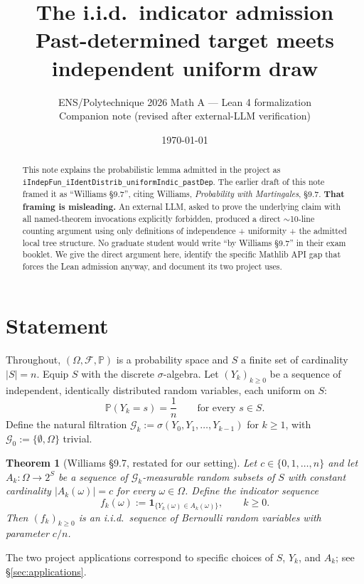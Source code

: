 \documentclass[11pt,a4paper]{article}
\title{The i.i.d.\ indicator admission \\
  \large Past-determined target meets independent uniform draw}
\author{ENS/Polytechnique 2026 Math A --- Lean 4 formalization\\
  Companion note (revised after external-LLM verification)}
\date{\today}
\newcommand{\Prob}{\mathbb{P}}
\newcommand{\F}{\mathcal{F}}
\newcommand{\G}{\mathcal{G}}
\newcommand{\one}{\mathbf{1}}
\theoremstyle{plain}
\newtheorem{thm}{Theorem}
\theoremstyle{definition}
\theoremstyle{remark}
\begin{document}
\maketitle

\begin{abstract}
This note explains the probabilistic lemma admitted in the project as
\verb|iIndepFun_iIdentDistrib_uniformIndic_pastDep|. The earlier
draft of this note framed it as ``Williams \S 9.7'', citing
Williams, \emph{Probability with Martingales}, \S 9.7. \textbf{That
framing is misleading.} An external LLM, asked to prove the
underlying claim with all named-theorem invocations explicitly
forbidden, produced a direct $\sim$10-line counting argument
using only definitions of independence + uniformity + the
admitted local tree structure. No graduate student would write
``by Williams \S 9.7'' in their exam booklet. We give the direct
argument here, identify the specific Mathlib API gap that forces
the Lean admission anyway, and document its two project uses.
\end{abstract}

\section{Statement}

Throughout, $(\Omega, \F, \Prob)$ is a probability space and $S$ a
finite set of cardinality $|S| = n$. Equip $S$ with the discrete
$\sigma$-algebra. Let $(Y_k)_{k \geq 0}$ be a sequence of independent,
identically distributed random variables, each uniform on $S$:
\[
  \Prob(Y_k = s) = \frac{1}{n} \qquad \text{for every } s \in S.
\]
Define the natural filtration $\G_k := \sigma(Y_0, Y_1, \dots, Y_{k-1})$
for $k \geq 1$, with $\G_0 := \{\emptyset, \Omega\}$ trivial.

\begin{thm}[Williams \S 9.7, restated for our setting]
\label{thm:main}
Let $c \in \{0, 1, \dots, n\}$ and let $A_k : \Omega \to 2^S$ be a
sequence of $\G_k$-measurable random subsets of $S$ with constant
cardinality $|A_k(\omega)| = c$ for every $\omega \in \Omega$.
Define the indicator sequence
\[
  f_k(\omega) := \one_{\{Y_k(\omega) \in A_k(\omega)\}}, \qquad k \geq 0.
\]
Then $(f_k)_{k \geq 0}$ is an i.i.d.\ sequence of Bernoulli random
variables with parameter $c/n$.
\end{thm}

\noindent The two project applications correspond to specific choices of $S$,
$Y_k$, and $A_k$; see \S\ref{sec:applications}.
\end{document}

